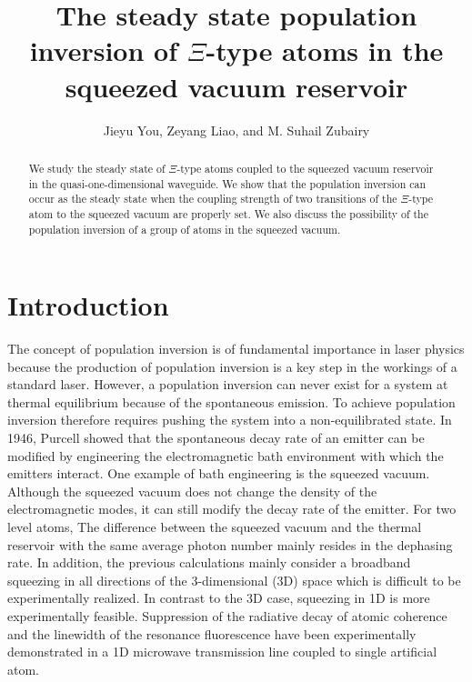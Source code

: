 \documentclass[aps,showpacs,twocolumn,twoside,groupedaddress]{revtex4}
\begin{document}
\title{The steady state population inversion of $\Xi$-type atoms in the squeezed vacuum reservoir}
\author{Jieyu You, Zeyang Liao, and M. Suhail Zubairy}

\begin{abstract}
We study the steady state of $\Xi$-type atoms coupled to the squeezed vacuum reservoir in the quasi-one-dimensional waveguide. We show that the population inversion can occur as the steady state when the coupling strength of two transitions of the $\Xi$-type atom to the squeezed vacuum are properly set. We also discuss the possibility of the population inversion of a group of atoms in the squeezed vacuum. 
\end{abstract}
\maketitle 


\section{Introduction}
The concept of population inversion is of fundamental importance in laser physics because the production of population inversion is a key step in the workings of a standard laser. However, a population inversion can never exist for a system at thermal equilibrium because of the spontaneous emission. To achieve population inversion therefore requires pushing the system into a non-equilibrated state\cite{svelto1998principles}. In 1946, Purcell showed that the spontaneous decay rate of an emitter can be modified by engineering the electromagnetic bath environment with which the emitters interact\cite{purcell1946purcell}. One example of bath engineering is the squeezed vacuum. Although the squeezed vacuum does not change the density of the electromagnetic modes, it can still modify the decay rate of the emitter\cite{gardiner1986cw, collett1984mj,gea1988vacuum}. For two level atoms, The difference between the squeezed vacuum and the thermal reservoir with the same average photon number mainly resides in the dephasing rate\cite{gardiner1987cw, palma1989gm, agarwal1990cooperative, ficek1990spontaneous,ficek1991z, goldstein1996ev}. In addition, the previous calculations mainly consider a broadband squeezing
in all directions of the 3-dimensional (3D) space which is difficult to be experimentally realized. In contrast
to the 3D case, squeezing in 1D is more experimentally feasible. Suppression of the radiative decay of atomic coherence and the linewidth of the resonance fluorescence have been experimentally demonstrated in a 1D microwave transmission line coupled to single artificial atom\cite{turchette1998qa,murch2013kw, toyli2016resonance, bergeal2010analog, wang2018cavity,qin2018exponentially}. 
\end{document}
